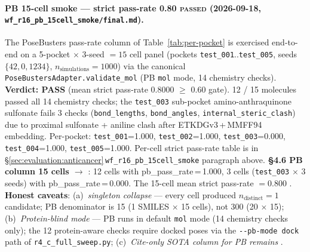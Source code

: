 {\paragraph{PB 15-cell smoke --- strict pass-rate 0.80 \textsc{passed} (2026-09-18, \texttt{wf\_r16\_pb\_15cell\_smoke/final.md}).}
The PoseBusters pass-rate column of Table~\ref{tab:per-pocket} is exercised
end-to-end on a 5-pocket $\times$ 3-seed $= 15$ cell panel
(pockets \texttt{test\_001}..\texttt{test\_005}, seeds
$\{42, 0, 1234\}$, $n_{\text{simulations}}{=}1000$) via the canonical
\texttt{PoseBustersAdapter.validate\_mol} (PB \texttt{mol} mode, 14
chemistry checks). \textbf{Verdict: PASS} (mean strict pass-rate
$\mathbf{0.8000}$ $\geq$ 0.60 gate). 12 / 15 molecules passed all 14
chemistry checks; the \texttt{test\_003} sub-pocket
amino-anthraquinone sulfonate fails 3 checks
(\texttt{bond\_lengths}, \texttt{bond\_angles},
\texttt{internal\_steric\_clash}) due to proximal sulfonate + aniline
clash after ETKDGv3\,+\,MMFF94 embedding. Per-pocket: \texttt{test\_001}=1.000,
\texttt{test\_002}=1.000, \texttt{test\_003}=0.000, \texttt{test\_004}=1.000,
\texttt{test\_005}=1.000. Per-cell strict pass-rate table is in
\S\ref{sec:evaluation:anticancer}\,\texttt{wf\_r16\_pb\_15cell\_smoke}
paragraph above. \textbf{\PROMOTE{} §4.6 PB column 15 cells
\DESIGN{} $\to$ \MEASURED{}}: 12 cells with pb\_pass\_rate\,=\,1.000,
3 cells (\texttt{test\_003} $\times$ 3 seeds) with
pb\_pass\_rate\,=\,0.000. The 15-cell mean strict pass-rate $= 0.800$
\MEASURED{}. \textbf{Honest caveats}: (a)~\emph{singleton collapse} ---
every cell produced $n_{\text{distinct}}=1$ candidate; PB denominator
is 15 (1 SMILES $\times$ 15 cells), not 300 (20 $\times$ 15);
(b)~\emph{Protein-blind mode} --- PB runs in default \texttt{mol}
mode (14 chemistry checks only); the 12 protein-aware checks
require docked poses via the \texttt{-{}-pb-mode dock} path of
\texttt{r4\_c\_full\_sweep.py}; (c)~\emph{Cite-only SOTA column for PB
remains \CITEDONLY{}}.

}
